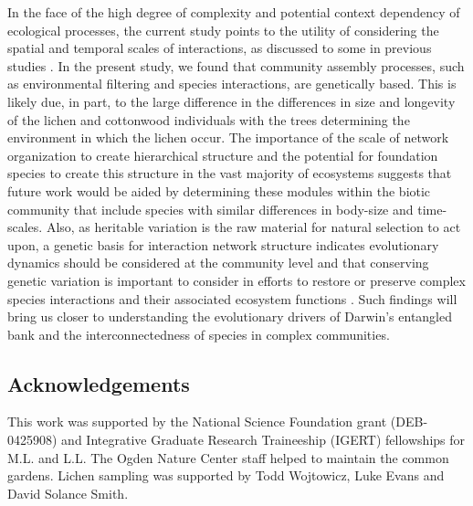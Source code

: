\documentclass[fleqn,12pt]{olplainarticle}
\begin{document}
In the face of the high degree of complexity and potential context
dependency of ecological processes, the current study points to the
utility of considering the spatial and temporal scales of
interactions, as discussed to some in previous studies
\cite{Bangert2006, Zook2010, Zytynska2012}. In the present study, we
found that community assembly processes, such as environmental
filtering and species interactions, are genetically based. This is
likely due, in part, to the large difference in the differences in
size and longevity of the lichen and cottonwood individuals with the
trees determining the environment in which the lichen occur. The
importance of the scale of network organization to create hierarchical
structure \cite{Guimaraes2020TheOrganization} and the potential for
foundation species to create this structure in the vast majority of
ecosystems \cite{Ellison2005, Whitham2006a} suggests that future work
would be aided by determining these modules within the biotic
community that include species with similar differences in body-size
and time-scales. Also, as heritable variation is the raw material for
natural selection to act upon, a genetic basis for interaction network
structure indicates evolutionary dynamics should be considered at the
community level and that conserving genetic variation is important to
consider in efforts to restore or preserve complex species
interactions and their associated ecosystem functions
\cite{Evans2013}. Such findings will bring us closer to understanding
the evolutionary drivers of Darwin's entangled bank and the
interconnectedness of species in complex communities.


\subsection*{Acknowledgements}

This work was supported by the National Science Foundation grant
(DEB-0425908) and Integrative Graduate Research Traineeship (IGERT)
fellowships for M.L. and L.L. The Ogden Nature Center staff helped to
maintain the common gardens. Lichen sampling was supported by Todd
Wojtowicz, Luke Evans and David Solance Smith.



\end{document}
